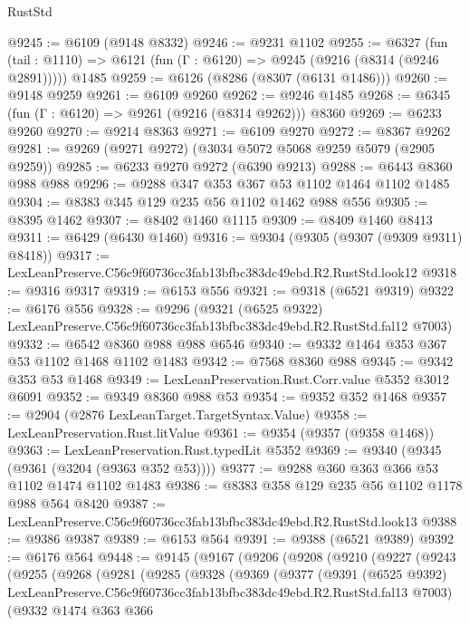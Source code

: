 \begin{lexlean}{RustStd}
\begin{coremodule}
@9245 := @6109 (@9148 @8332)
@9246 := @9231 @1102
@9255 := @6327
    (fun (tail : @1110) => @6121 (fun (Γ : @6120) => @9245 (@9216 (@8314 (@9246 @2891)))))
    @1485
@9259 := @6126 (@8286 (@8307 (@6131 @1486)))
@9260 := @9148 @9259
@9261 := @6109 @9260
@9262 := @9246 @1485
@9268 := @6345 (fun (Γ : @6120) => @9261 (@9216 (@8314 @9262))) @8360
@9269 := @6233 @9260
@9270 := @9214 @8363
@9271 := @6109 @9270
@9272 := @8367 @9262
@9281 := @9269 (@9271 @9272) (@3034 @5072 @5068 @9259 @5079 (@2905 @9259))
@9285 := @6233 @9270 @9272 (@6390 @9213)
@9288 := @6443 @8360 @988 @988
@9296 := @9288 @347 @353 @367 @53 @1102 @1464 @1102 @1485
@9304 := @8383 @345 @129 @235 @56 @1102 @1462 @988 @556
@9305 := @8395 @1462
@9307 := @8402 @1460 @1115
@9309 := @8409 @1460 @8413
@9311 := @6429 (@6430 @1460)
@9316 := @9304 (@9305 (@9307 (@9309 @9311) @8418))
@9317 := LexLeanPreserve.C56c9f60736cc3fab13bfbc383dc49ebd.R2.RustStd.look12
@9318 := @9316 @9317
@9319 := @6153 @556
@9321 := @9318 (@6521 @9319)
@9322 := @6176 @556
@9328 := @9296
    (@9321 (@6525 @9322) LexLeanPreserve.C56c9f60736cc3fab13bfbc383dc49ebd.R2.RustStd.fal12 @7003)
@9332 := @6542 @8360 @988 @988 @6546
@9340 := @9332 @1464 @353 @367 @53 @1102 @1468 @1102 @1483
@9342 := @7568 @8360 @988
@9345 := @9342 @353 @53 @1468
@9349 := LexLeanPreservation.Rust.Corr.value @5352 @3012 @6091
@9352 := @9349 @8360 @988 @53
@9354 := @9352 @352 @1468
@9357 := @2904 (@2876 LexLeanTarget.TargetSyntax.Value)
@9358 := LexLeanPreservation.Rust.litValue
@9361 := @9354 (@9357 (@9358 @1468))
@9363 := LexLeanPreservation.Rust.typedLit @5352
@9369 := @9340 (@9345 (@9361 (@3204 (@9363 @352 @53))))
@9377 := @9288 @360 @363 @366 @53 @1102 @1474 @1102 @1483
@9386 := @8383 @358 @129 @235 @56 @1102 @1178 @988 @564 @8420
@9387 := LexLeanPreserve.C56c9f60736cc3fab13bfbc383dc49ebd.R2.RustStd.look13
@9388 := @9386 @9387
@9389 := @6153 @564
@9391 := @9388 (@6521 @9389)
@9392 := @6176 @564
@9448 := @9145
    (@9167
      (@9206
        (@9208
          (@9210
            (@9227
              (@9243
                (@9255
                  (@9268
                    (@9281
                      (@9285
                        (@9328
                          (@9369
                            (@9377
                              (@9391
                                (@6525 @9392)
                                LexLeanPreserve.C56c9f60736cc3fab13bfbc383dc49ebd.R2.RustStd.fal13
                                @7003)
                              (@9332
                                @1474
                                @363
                                @366

\end{coremodule}
\end{lexlean}
